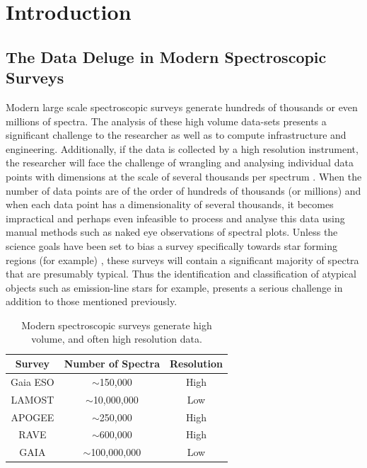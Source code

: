 \chapter{Introduction}
\section{The Data Deluge in Modern Spectroscopic Surveys}
Modern large scale spectroscopic surveys generate hundreds of thousands or even millions of spectra. The analysis of these high volume data-sets presents a significant challenge to the researcher as well as to compute infrastructure and engineering. Additionally, if the data is collected by a high resolution instrument, the researcher will face the challenge of wrangling and analysing individual data points with dimensions at the scale of several thousands per spectrum \cite{buder2021galah+}. 
When the number of data points are of the order of hundreds of thousands (or millions) and when each data point has a dimensionality of several thousands, it becomes impractical and perhaps even infeasible to process and analyse this data using manual methods such as naked eye observations of spectral plots. Unless the science goals have been set to bias a survey specifically towards star forming regions (for example) \cite{traven2015gaia}, these surveys will contain a significant majority of spectra that are presumably typical. Thus the identification and classification of atypical objects such as emission-line stars for example, presents a serious challenge in addition to those mentioned previously.

\begin{table}[]
\begin{center}
\begin{tabular}{|c|c|c|}
\hline
\textbf{Survey} & \textbf{Number of Spectra} & \textbf{Resolution} \\ \hline
Gaia ESO        & $\sim$150,000              & High                \\ \hline
LAMOST          & $\sim$10,000,000           & Low                 \\ \hline
APOGEE          & $\sim$250,000              & High                \\ \hline
RAVE            & $\sim$600,000              & High                \\ \hline
GAIA            & $\sim$100,000,000          & Low                 \\ \hline
\end{tabular}
\caption{Modern spectroscopic surveys generate high volume, and often high resolution data.}
\label{table:draglift1}
\end{center}
\end{table}

